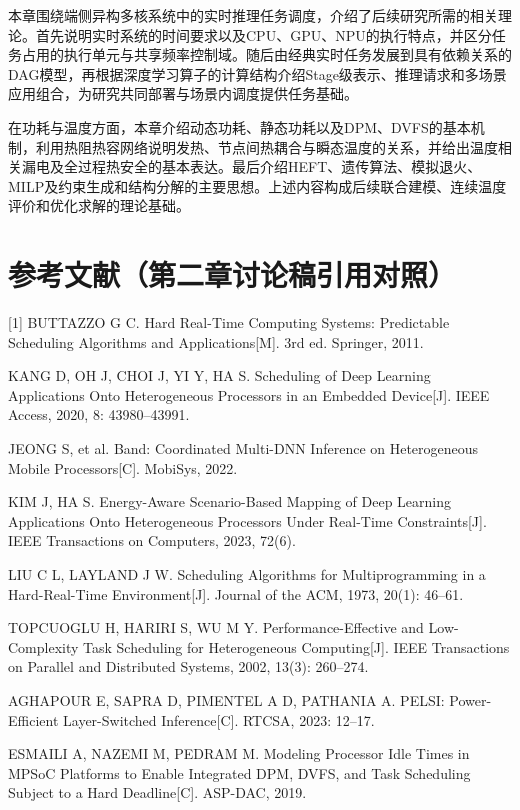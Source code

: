 本章围绕端侧异构多核系统中的实时推理任务调度，介绍了后续研究所需的相关理论。首先说明实时系统的时间要求以及CPU、GPU、NPU的执行特点，并区分任务占用的执行单元与共享频率控制域。随后由经典实时任务发展到具有依赖关系的DAG模型，再根据深度学习算子的计算结构介绍Stage级表示、推理请求和多场景应用组合，为研究共同部署与场景内调度提供任务基础。

在功耗与温度方面，本章介绍动态功耗、静态功耗以及DPM、DVFS的基本机制，利用热阻热容网络说明发热、节点间热耦合与瞬态温度的关系，并给出温度相关漏电及全过程热安全的基本表达。最后介绍HEFT、遗传算法、模拟退火、MILP及约束生成和结构分解的主要思想。上述内容构成后续联合建模、连续温度评价和优化求解的理论基础。

\section*{参考文献（第二章讨论稿引用对照）}
\begingroup\small\setlength{\parindent}{0pt}\setlength{\parskip}{4pt}
[1] BUTTAZZO G C. Hard Real-Time Computing Systems: Predictable Scheduling Algorithms and Applications[M]. 3rd ed. Springer, 2011.\par
[2] KANG D, OH J, CHOI J, YI Y, HA S. Scheduling of Deep Learning Applications Onto Heterogeneous Processors in an Embedded Device[J]. IEEE Access, 2020, 8: 43980--43991.\par
[3] JEONG S, et al. Band: Coordinated Multi-DNN Inference on Heterogeneous Mobile Processors[C]. MobiSys, 2022.\par
[4] KIM J, HA S. Energy-Aware Scenario-Based Mapping of Deep Learning Applications Onto Heterogeneous Processors Under Real-Time Constraints[J]. IEEE Transactions on Computers, 2023, 72(6).\par
[5] LIU C L, LAYLAND J W. Scheduling Algorithms for Multiprogramming in a Hard-Real-Time Environment[J]. Journal of the ACM, 1973, 20(1): 46--61.\par
[6] TOPCUOGLU H, HARIRI S, WU M Y. Performance-Effective and Low-Complexity Task Scheduling for Heterogeneous Computing[J]. IEEE Transactions on Parallel and Distributed Systems, 2002, 13(3): 260--274.\par
[7] AGHAPOUR E, SAPRA D, PIMENTEL A D, PATHANIA A. PELSI: Power-Efficient Layer-Switched Inference[C]. RTCSA, 2023: 12--17.\par
[8] ESMAILI A, NAZEMI M, PEDRAM M. Modeling Processor Idle Times in MPSoC Platforms to Enable Integrated DPM, DVFS, and Task Scheduling Subject to a Hard Deadline[C]. ASP-DAC, 2019.\par
